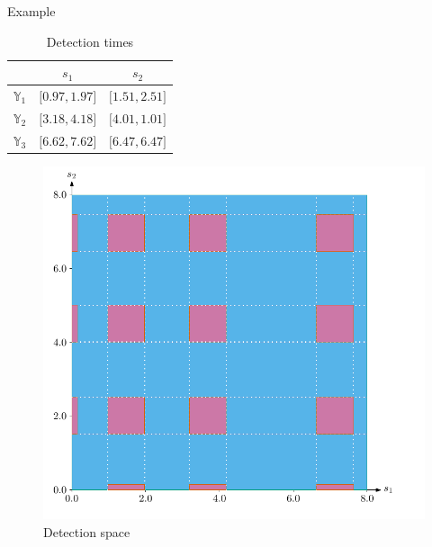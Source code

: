 \documentclass{beamer}
\begin{document}
        \begin{frame}{Example}
            \begin{minipage}{0.45\textwidth}
                \begin{table}
                    \begin{tabular}{@{} rcc @{}}
                        \toprule
                        & $s_1$ & $s_2$ \\
                        \midrule
                        $\mathbb{Y}_1$ & $\lbrack0.97, 1.97\rbrack$ & $\lbrack1.51, 2.51\rbrack$  \\
                        $\mathbb{Y}_2$ & $\lbrack3.18, 4.18\rbrack$ & $\lbrack4.01, 1.01\rbrack$ \\
                        $\mathbb{Y}_3$ & $\lbrack6.62, 7.62\rbrack$ & $\lbrack6.47, 6.47\rbrack$ \\
                        \bottomrule
                    \end{tabular}
                    \caption{Detection times}
                \end{table}
            \end{minipage}
            \hfill
            \begin{minipage}{0.5\textwidth}
                \begin{figure}
                    \includegraphics[height=0.7\textheight]{imgs/detection_space}
                    \caption{Detection space}
                \end{figure}
            \end{minipage}
        \end{frame}
\end{document}
